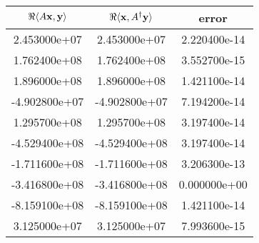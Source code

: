 \begin{tabular}{ccc}
 $\Re\langle A\mathbf{x},\mathbf{y} \rangle$ & $\Re\langle \mathbf{x},A^{\dagger}\mathbf{y} \rangle$ & error \\
\hline
2.453000e+07 & 2.453000e+07 & 2.220400e-14 \\
1.762400e+08 & 1.762400e+08 & 3.552700e-15 \\
1.896000e+08 & 1.896000e+08 & 1.421100e-14 \\
-4.902800e+07 & -4.902800e+07 & 7.194200e-14 \\
1.295700e+08 & 1.295700e+08 & 3.197400e-14 \\
-4.529400e+08 & -4.529400e+08 & 3.197400e-14 \\
-1.711600e+08 & -1.711600e+08 & 3.206300e-13 \\
-3.416800e+08 & -3.416800e+08 & 0.000000e+00 \\
-8.159100e+08 & -8.159100e+08 & 1.421100e-14 \\
3.125000e+07 & 3.125000e+07 & 7.993600e-15 \\
\hline
\end{tabular}
